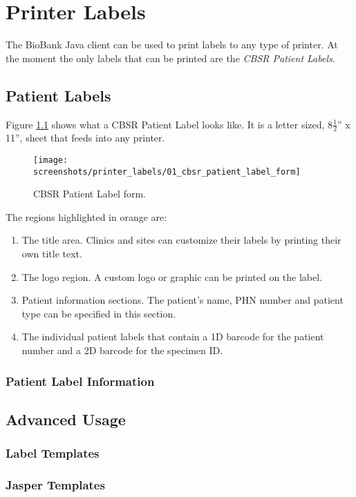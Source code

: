 \chapter{Printer Labels}
\label{chap:printer_labels}

The BioBank Java client can be used to print labels to any type of printer. At
the moment the only labels that can be printed are the \emph{CBSR Patient
  Labels}.

\section{Patient Labels}
\label{sec:printer_labels}

Figure \ref{fig:cbsr_patient_label} shows what a CBSR Patient Label looks
like. It is a letter sized, 8$\frac{1}{2}$'' x 11'', sheet that feeds into any
printer.

    \begin{figure}[H]
      \centering
      \scalebox{0.35}
      { \texttt{[image: screenshots/printer\_labels/01\_cbsr\_patient\_label\_form]} }
      \caption{CBSR Patient Label form.}
      \label{fig:cbsr_patient_label}
    \end{figure}

The regions highlighted in orange are:
\begin{enumerate}
  \item The title area. Clinics and sites can customize their labels by
    printing their own title text.
  \item The logo region. A custom logo or graphic can be printed on the label.
  \item Patient information sections. The patient's name, PHN number and
    patient type can be specified in this section.
  \item The individual patient labels that contain a 1D barcode for the patient
    number and a 2D barcode for the specimen ID.
\end{enumerate}

\subsection{Patient Label Information}

\section{Advanced Usage}

\subsection{Label Templates}

\subsection{Jasper Templates}
